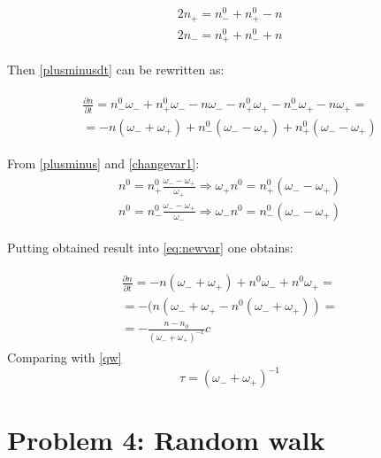 \documentclass[10pt]{article}
\begin{document}
\begin{align}
\begin{split}
2n_{+} = n_{-}^0 + n_{+}^0 - n\\
2n_{-} = n_{+}^0 + n_{-}^0 + n
\label{eq:2n}
\end{split}
\end{align}

Then \ref{plusminusdt} can be rewritten as:

\begin{align}
\begin{split}
\frac{\partial n}{\partial t} = n_{-}^0\omega_{-} + n_{+}^0\omega_{-} - n\omega_{-} - n_{+}^0\omega_{+} - n_{-}^0\omega_{+} - n\omega_{+} = \\
= -n(\omega_{-} + \omega_{+}) + n_{-}^0(\omega_{-} - \omega_{+}) + n_{+}^0(\omega_{-} - \omega_{+})
\label{eq:newvar}
\end{split}
\end{align}

From \ref{plusminus} and \ref{changevar1}:
\begin{align}
\begin{split}
n^0 = n_{+}^0\frac{\omega_{-}-\omega_{+}}{\omega_{+}} \Rightarrow \omega_{+}n^0 =n_{+}^0(\omega_{-}-\omega_{+}) \\
n^0 = n_{-}^0\frac{\omega_{-}-\omega_{+}}{\omega_{-}} \Rightarrow \omega_{-}n^0 = n_{-}^0(\omega_{-}-\omega_{+})
\label{eq:newvar2}
\end{split}
\end{align}

Putting obtained result into \ref{eq:newvar} one obtains:

\begin{align}
\begin{split}
\frac{\partial n}{\partial t} = -n(\omega_{-} + \omega_{+}) + n^0\omega_{-} + n^0\omega_{+} = \\
= -(n(\omega_{-} + \omega_{+} - n^0(\omega_{-} + \omega_{+})) = \\
= - \frac{n - n_0}{(\omega_{-} + \omega_{+})^{-1}}
c
\end{split}
\end{align}
Comparing with \ref{qw}
\begin{equation}\label{changevar123}
\tau = (\omega_{-} + \omega_{+})^{-1}
\end{equation}

\section{Problem 4: Random walk}
\end{document}

